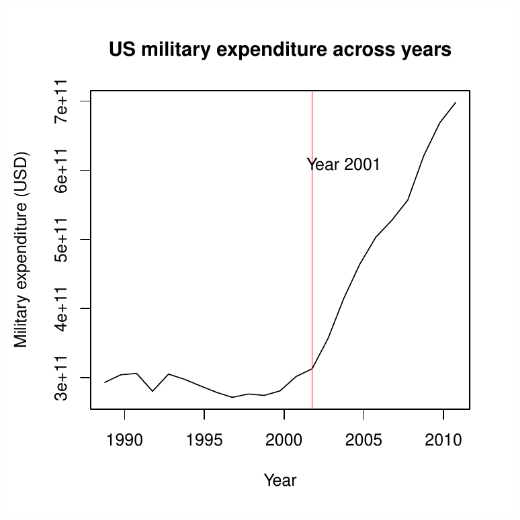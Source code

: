 \documentclass{article}\usepackage[]{graphicx}\usepackage[]{color}
\makeatletter
\def\maxwidth{ %
  \ifdim\Gin@nat@width>\linewidth
    \linewidth
  \else
    \Gin@nat@width
  \fi
}
\newenvironment{knitrout}{}{} %
\makeatother
\begin{document}
\begin{knitrout}
{\centering \includegraphics[width=\maxwidth]{figure/US_military_expenditure_plot} 

}



\end{knitrout}
\end{document}
